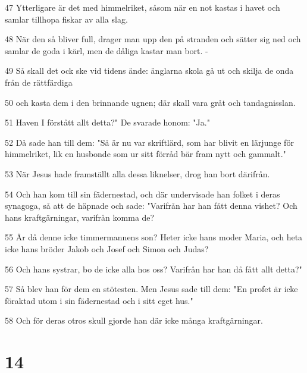 \par 47 Ytterligare är det med himmelriket, såsom när en not kastas i havet och samlar tillhopa fiskar av alla slag.
\par 48 När den så bliver full, drager man upp den på stranden och sätter sig ned och samlar de goda i kärl, men de dåliga kastar man bort. -
\par 49 Så skall det ock ske vid tidens ände: änglarna skola gå ut och skilja de onda från de rättfärdiga
\par 50 och kasta dem i den brinnande ugnen; där skall vara gråt och tandagnisslan.
\par 51 Haven I förstått allt detta?" De svarade honom: "Ja."
\par 52 Då sade han till dem: "Så är nu var skriftlärd, som har blivit en lärjunge för himmelriket, lik en husbonde som ur sitt förråd bär fram nytt och gammalt."
\par 53 När Jesus hade framställt alla dessa liknelser, drog han bort därifrån.
\par 54 Och han kom till sin fädernestad, och där undervisade han folket i deras synagoga, så att de häpnade och sade: "Varifrån har han fått denna vishet? Och hans kraftgärningar, varifrån komma de?
\par 55 Är då denne icke timmermannens son? Heter icke hans moder Maria, och heta icke hans bröder Jakob och Josef och Simon och Judas?
\par 56 Och hans systrar, bo de icke alla hos oss? Varifrån har han då fått allt detta?"
\par 57 Så blev han för dem en stötesten. Men Jesus sade till dem: "En profet är icke föraktad utom i sin fädernestad och i sitt eget hus."
\par 58 Och för deras otros skull gjorde han där icke många kraftgärningar.

\chapter{14}

